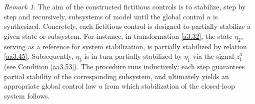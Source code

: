 \documentclass[10pt, a4paper]{amsart}
\makeatletter
\theoremstyle{plain}
\newtheorem{lemma}{Lemma}[section]
\theoremstyle{definition}
\theoremstyle{remark}
\newtheorem{remark}[lemma]{Remark}
\renewenvironment{proof}[1][\proofname]{\par
  \pushQED{\qed}%
  \normalfont \topsep6\p@\@plus6\p@\relax
  \trivlist
  \item[\hskip\labelsep
        \itshape
    #1\ \ref{#1}.]\ignorespaces
}{%
  \popQED\endtrivlist\@endpefalse
}
\numberwithin{equation}{section}
\makeatother
\begin{document}
    
\begin{remark}
The aim of the constructed fictitious controls is to stabilize, step by step and recursively, subsystems of model until the global control $u$ is synthesized. Concretely, each fictitious control is designed to partially stabilize a given state or subsystem. For instance, in transformation \eqref{a3.32}, the state \(\eta_2\), serving as a reference for system stabilization, is partially stabilized by relation \eqref{aa3.45}. Subsequently, \(\eta_3\) is in turn partially stabilized by \(\eta_1\) via the signal \(z^3_1\) (see Condition \eqref{aa3.53}). The procedure runs inductively: each step guarantees partial stability of the corresponding subsystem, and ultimately yields an appropriate global control law \(u\) from which stabilization of the closed-loop system follows.
\end{remark}
\end{document}
